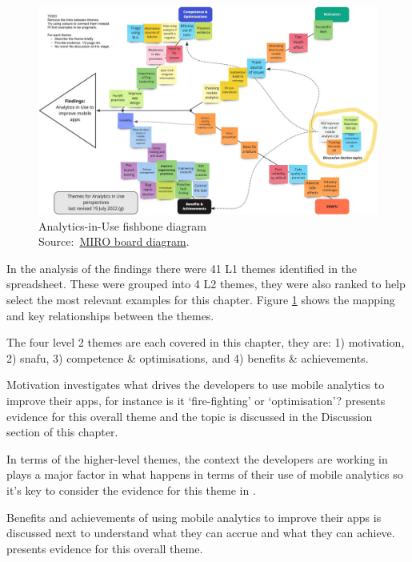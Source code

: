 \begin{figure}
    \centering
    \includegraphics[width=\linewidth]{images/rough-sketches/analytics-in-use-fishbone-diagram-19-jul-2022g.jpeg}
    \caption[Analytics-in-Use fishbone diagram]{Analytics-in-Use fishbone diagram\\Source:~\href{https://miro.com/app/board/uXjVOlelPDU=/?share_link_id=219460632025}{MIRO board diagram}.}
    \label{fig:analytics-in-use-fishbone-diagram}
\end{figure}

In the analysis of the findings there were 41 L1 themes identified in the spreadsheet. These were grouped into  4 L2 themes, they were also ranked to help select the most relevant examples for this chapter. Figure \ref{fig:analytics-in-use-fishbone-diagram} shows the mapping and key relationships between the themes.

The four level 2 themes are each covered in this chapter, they are: 1) motivation, 2) \Gls{snafu}, 3) competence \& optimisations, and 4) benefits \& achievements.

Motivation investigates what drives the developers to use mobile analytics to improve their apps, for instance is it `fire-fighting' or `optimisation'?  presents evidence for this overall theme and the topic is discussed in the Discussion section of this chapter.

In terms of the higher-level themes, the context the developers are working in plays a major factor in what happens in terms of their use of mobile analytics so it's key to consider the evidence for this theme in .

Benefits and achievements of using mobile analytics to improve their apps is discussed next to understand what they can accrue and what they can achieve.  presents evidence for this overall theme.

